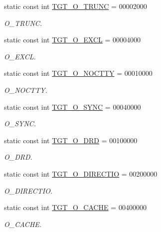 \begin{Indent}{\bf }
\begin{DoxyCompactItemize}
static const int \hyperlink{classAlphaLinux_a4f892ee6e1424a2becd859b0bef1f18b}{TGT\_\-O\_\-TRUNC} = 00002000
\begin{DoxyCompactList}\small\item\em O\_\-TRUNC. \item\end{DoxyCompactList}\item 
static const int \hyperlink{classAlphaLinux_a10d5d118d15b51ebdd4b16dc78342d1d}{TGT\_\-O\_\-EXCL} = 00004000
\begin{DoxyCompactList}\small\item\em O\_\-EXCL. \item\end{DoxyCompactList}\item 
static const int \hyperlink{classAlphaLinux_adfd4240281579e5f60c5e22c601225d8}{TGT\_\-O\_\-NOCTTY} = 00010000
\begin{DoxyCompactList}\small\item\em O\_\-NOCTTY. \item\end{DoxyCompactList}\item 
static const int \hyperlink{classAlphaLinux_abf43ab05d2a5b6b8113952160d8565db}{TGT\_\-O\_\-SYNC} = 00040000
\begin{DoxyCompactList}\small\item\em O\_\-SYNC. \item\end{DoxyCompactList}\item 
static const int \hyperlink{classAlphaLinux_a83feaef06c27596d44d489ec51e197fd}{TGT\_\-O\_\-DRD} = 00100000
\begin{DoxyCompactList}\small\item\em O\_\-DRD. \item\end{DoxyCompactList}\item 
static const int \hyperlink{classAlphaLinux_a0a80dc00bd46d433f1ff0d38da2f5ded}{TGT\_\-O\_\-DIRECTIO} = 00200000
\begin{DoxyCompactList}\small\item\em O\_\-DIRECTIO. \item\end{DoxyCompactList}\item 
static const int \hyperlink{classAlphaLinux_ab30a547e309825ec5f9c5d11a6da543c}{TGT\_\-O\_\-CACHE} = 00400000
\begin{DoxyCompactList}\small\item\em O\_\-CACHE. \item\end{DoxyCompactList}\item 

\end{DoxyCompactItemize}
\end{Indent}
